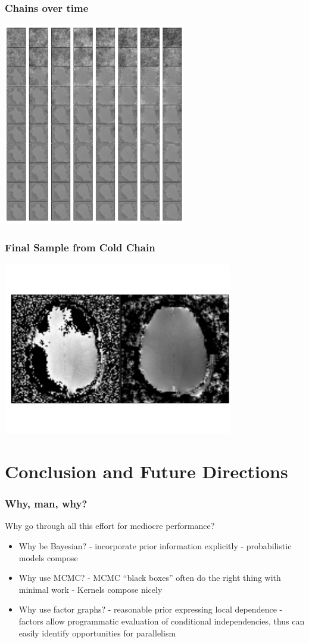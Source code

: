 \documentclass[compress]{beamer}
\begin{document}
\begin{frame}
  \frametitle{Chains over time}
  \includegraphics[width=8cm]{data_replicas}
\end{frame}

\begin{frame}
  \frametitle{Final Sample from Cold Chain}
  \includegraphics[width=10cm]{data_results}
\end{frame}

\section{Conclusion and Future Directions}
\frame{\tableofcontents[currentsection]}

\begin{frame}
  \frametitle{Why, man, why?}
  Why go through all this effort for mediocre performance? 
  \begin{itemize}[<+->]
    \item Why be Bayesian?  
       - incorporate prior information explicitly
       - probabilistic models compose
    \item Why use MCMC? 
       - MCMC ``black boxes'' often do the right thing with minimal work
       - Kernels compose nicely \cite{Bonawitz_Composable_2008}
    \item Why use factor graphs? 
       - reasonable prior expressing local dependence 
       - factors allow programmatic evaluation of conditional independencies, 
       thus can easily identify opportunities for parallelism
  \end{itemize}
  
\end{frame}
\end{document}
